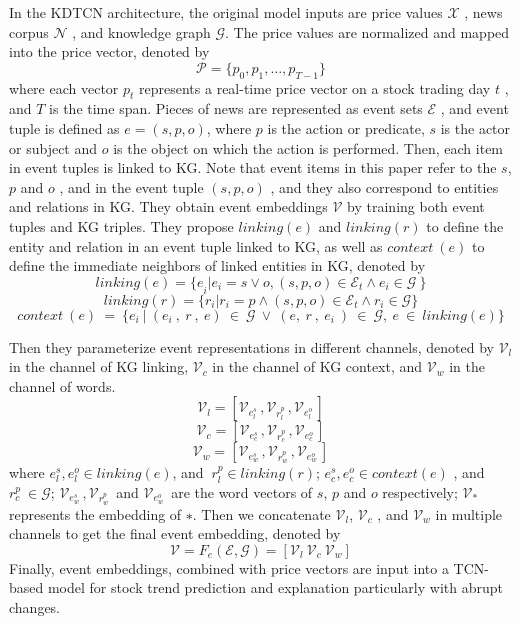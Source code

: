 In the KDTCN architecture, the original model inputs are price values $\mathcal{X}$ , news corpus $\mathcal{N}$ , and knowledge graph $\mathcal{G}$. The price values are normalized and mapped into the price vector, denoted by
$$\mathcal{P}=\{p_0,p_1,\ldots,p_{T-1}\}$$
where each vector $p_t$ represents a real-time price vector on a stock trading day $t$ , and $T$  is the time span. Pieces of news are represented as event sets $\mathcal{E}$ , and event tuple is defined as $ e = (s,p, o)$, where $p$  is the action or predicate, $s$ is the actor or subject and $o$  is the object on which the action is performed. Then, each item in event tuples is linked to KG. Note that event items in this paper refer to the $s$, $p$ and $o$ ,  and  in the event tuple $(s, p, o)$ , and they also correspond to entities and relations in KG. They obtain event embeddings $\mathcal{V}$  by training both event tuples and KG triples. 
They propose $linking(e)$ and $linking(r)$ to define the entity and relation in an event tuple linked to KG, as well as $context\ (e)$ to define the immediate neighbors of linked entities in KG, denoted by
$$linking\left(e\right)={\{e}_i|e_i=s\vee o,\left(s,p,o\right)\in\mathcal{E}_t\land e_i\in\mathcal{G}\ \}$$ $$linking\left(r\right)=\{r_i|r_i=p\land\left(s,p,o\right)\in\mathcal{E}_t\land r_i\in\mathcal{G}\}$$
$$context\ (e)\ =\ \{e_i\ |\ (e_i\ ,\ r\ ,\ e)\ \in\ \mathcal{G}\ \vee\ (e,\ r\ ,\ e_i\ )\ \in\ \mathcal{G},\ e\ \in\ linking(e)\}$$

Then they parameterize event representations in different channels, denoted by $\mathcal{V}_l$ in the channel of KG linking,  $\mathcal{V}_c$ in the channel of KG context, and $\mathcal{V}_w$  in the channel of words.
$$\mathcal{V}_l=\left[\mathcal{V}_{e_l^s\ },\mathcal{V}_{r_l^p\ },\mathcal{V}_{e_l^o\ }\right]$$
$$\mathcal{V}_c=\left[\mathcal{V}_{e_c^s\ },\mathcal{V}_{r_c^p\ },\mathcal{V}_{e_c^o\ }\right]$$
$$\mathcal{V}_w=\left[\mathcal{V}_{e_w^s\ },\mathcal{V}_{r_w^p\ },\mathcal{V}_{e_w^o\ }\right]$$
where $e_l^s,e_l^o\in linking\left(e\right)$, and ${\ r}_l^p\in linking\left(r\right)$; $e_c^s,e_c^o\in context\left(e\right)$ , and $r_c^p\ \in\mathcal{G}$;  $\mathcal{V}_{e_w^s\ },\mathcal{V}_{r_w^p\ }$ and $\mathcal{V}_{e_w^o\ }$  are the word vectors of $s$, $p$ and $o$ respectively; $\mathcal{V}_\ast$ represents the embedding of $∗$. Then we concatenate $\mathcal{V}_l$, $\mathcal{V}_c $ ,  and $\mathcal{V}_w$   in multiple channels to get the final event embedding, denoted by
$$\mathcal{V}=F_e\left(\mathcal{E},\mathcal{G}\right)=\left[\mathcal{V}_l{\ \mathcal{V}}_c{\ \mathcal{V}}_w\right]$$
Finally, event embeddings, combined with price vectors are input into a TCN-based model for stock trend prediction and explanation particularly with abrupt changes.

